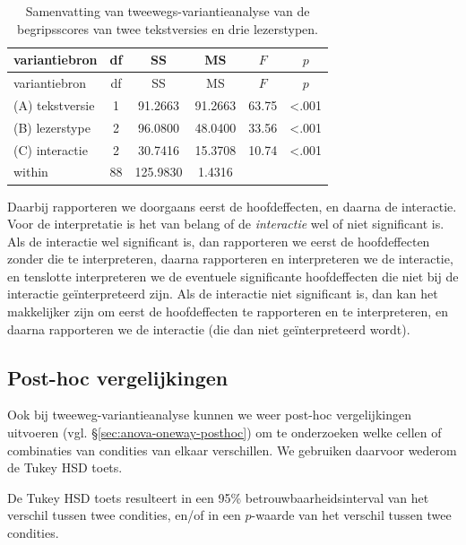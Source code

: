 \documentclass[
]{book}
\begin{document}
\begin{longtable}[]{@{}lccccc@{}}
\caption{\label{tab:DBE12anova} Samenvatting van tweewegs-variantieanalyse van de begripsscores van twee tekstversies en drie lezerstypen.}\tabularnewline
\toprule\noalign{}
variantiebron & df & SS & MS & \(F\) & \(p\) \\
\midrule\noalign{}
\endfirsthead
\toprule\noalign{}
variantiebron & df & SS & MS & \(F\) & \(p\) \\
\midrule\noalign{}
\endhead
\bottomrule\noalign{}
\endlastfoot
(A) tekstversie & 1 & 91.2663 & 91.2663 & 63.75 & \textless.001 \\
(B) lezerstype & 2 & 96.0800 & 48.0400 & 33.56 & \textless.001 \\
(C) interactie & 2 & 30.7416 & 15.3708 & 10.74 & \textless.001 \\
within & 88 & 125.9830 & 1.4316 & & \\
\end{longtable}

Daarbij rapporteren we doorgaans eerst de hoofdeffecten, en daarna de interactie.
Voor de interpretatie is het van belang of de \emph{interactie} wel of niet significant is.
Als de interactie wel significant is, dan rapporteren we eerst de hoofdeffecten zonder die te interpreteren, daarna rapporteren en interpreteren we de interactie, en tenslotte interpreteren we de eventuele significante hoofdeffecten die niet bij de interactie geïnterpreteerd zijn.
Als de interactie niet significant is, dan kan het makkelijker zijn om eerst de hoofdeffecten te rapporteren en te interpreteren, en daarna rapporteren we de interactie (die dan niet geïnterpreteerd wordt).

\subsection{Post-hoc vergelijkingen}\label{sec:anova-twoway-posthoc}

Ook bij tweeweg-variantieanalyse kunnen we weer post-hoc vergelijkingen uitvoeren (vgl. §\ref{sec:anova-oneway-posthoc}) om te onderzoeken welke cellen of combinaties van condities van elkaar verschillen. We gebruiken daarvoor wederom de Tukey HSD toets.

De Tukey HSD toets resulteert in
een 95\% betrouwbaarheidsinterval van het verschil tussen twee condities,
en/of in een \(p\)-waarde van het verschil tussen twee condities.
\end{document}

